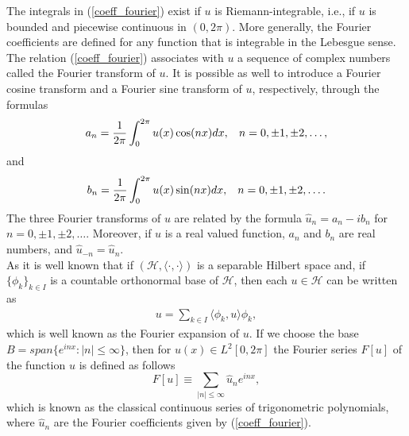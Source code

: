     The integrals in (\ref{coeff_fourier}) exist if $u$ is Riemann-integrable, i.e., if $u$ is bounded and piecewise continuous in $(0, 2 \pi)$. More generally, the Fourier coefficients are defined for any function that is integrable in the Lebesgue sense.\\
    
    The relation (\ref{coeff_fourier}) associates with $u$ a sequence of complex numbers called the Fourier transform of $u$. It is possible as well to introduce a Fourier cosine transform and a Fourier sine transform of $u$, respectively, through the formulas
    \begin{align}
    \label{coeff_a_n}
    	a_n = \frac{1}{2 \pi} \displaystyle \int_{0}^{2 \pi} u(x) \cos(nx) dx, \hspace{3mm}  n = 0, \pm 1, \pm 2, \dots,
    \end{align}
    and
    \begin{align}
    \label{coeff_b_n}
    	b_n = \frac{1}{2 \pi} \displaystyle \int_{0}^{2 \pi} u(x) \sin(nx) dx, \hspace{3mm}  n = 0, \pm 1, \pm 2, \dots.
    \end{align}
    The three Fourier transforms of $u$ are related by the formula $\hat{u}_n = a_n - ib_n$ for $n = 0, \pm 1, \pm 2, \dots$. Moreover, if $u$ is a real valued function, $a_n$ and $b_n$ are real numbers, and $\hat{u}_{-n} = \hat{u}_n$. \\
    
   	As it is well known that if $(\mathcal{H},\langle \cdot ,\cdot \rangle )$ is a separable Hilbert space and, if $\{ \phi_k \}_{k \in I}$ is a countable orthonormal base of $\mathcal{H}$, then each $u \in \mathcal{H}$ can be written as
	\begin{align*}
		\displaystyle u = \sum_{k \in I} \langle \phi_k, u \rangle \phi_k,
	\end{align*}
	which is well known as the Fourier expansion of $u$.
	If we choose the base $B = span\{e^{inx}: |n| \leq \infty \}$, then for $u(x) \in L^2 [0, 2\pi]$ the Fourier series $F[u]$ of the function $u$ is defined as follows
	\begin{equation}
	\label{fourier_series}  
		F[u] \equiv \displaystyle \sum_{ |n| \leq \infty} \hat{u}_{n} e^{inx},
	\end{equation}
	which is known as the classical continuous series of trigonometric polynomials, where $\hat{u}_{n}$ are the Fourier coefficients given by (\ref{coeff_fourier}). \\
	
